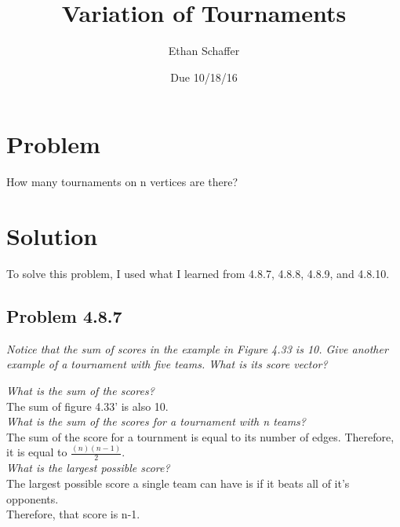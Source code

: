 \documentclass[11pt]{article} %
\title{Variation of Tournaments}
\author{Ethan Schaffer}
\date{Due 10/18/16}
\newcommand\tab[1][1cm]{\hspace*{#1}}
\begin{document}
\maketitle

\section{Problem}
How many tournaments on n vertices are there?

\section{Solution}
To solve this problem, I used what I learned from 4.8.7, 4.8.8, 4.8.9, and 4.8.10. 

\subsection*{Problem 4.8.7}
\textit{Notice that the sum of scores in the example in Figure 4.33 is 10. Give another example of a tournament with five teams. What is its score vector?}\\

\textit{What is the sum of the scores?}\\ 
\tab The sum of figure 4.33' is also 10. \\

\textit{What is the sum of the scores for a tournament with n teams?}\\
\tab The sum of the score for a tournment is equal to its number of edges. Therefore, it is equal to $\frac{(n)(n-1)}{2}$.\\

\textit{What is the largest possible score?} \\
\tab The largest possible score a single team can have is if it beats all of it's opponents. \\
\tab Therefore, that score is n-1.
\end{document}
